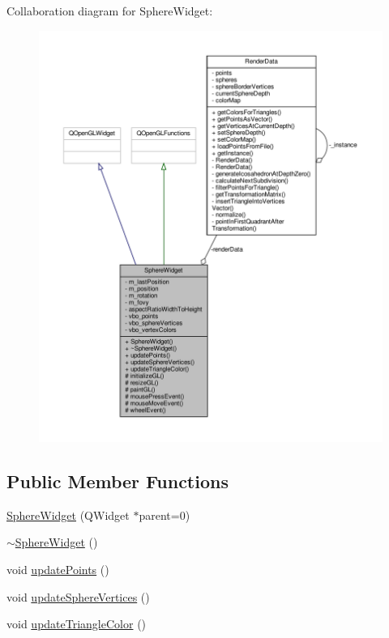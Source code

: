 Collaboration diagram for Sphere\+Widget\+:\nopagebreak
\begin{figure}[H]
\begin{center}
\leavevmode
\includegraphics[width=350pt]{class_sphere_widget__coll__graph}
\end{center}
\end{figure}
\subsection*{Public Member Functions}
\begin{DoxyCompactItemize}
\item 
\hyperlink{class_sphere_widget_a6ee7b3a4b58e5d62fb1c901aafdd1790}{Sphere\+Widget} (Q\+Widget $\ast$parent=0)
\item 
\hyperlink{class_sphere_widget_a1766e5d68f4c57f52d6b1ee40cc0326c}{$\sim$\+Sphere\+Widget} ()
\item 
void \hyperlink{class_sphere_widget_a692ca1c1e7556f6abd7b5f6a49a2557c}{update\+Points} ()
\item 
void \hyperlink{class_sphere_widget_a7d132800fb4d6b7b925c253679bb6445}{update\+Sphere\+Vertices} ()
\item 
void \hyperlink{class_sphere_widget_a871c5252a7a218c5d405be5dfc3dbfa1}{update\+Triangle\+Color} ()
\end{DoxyCompactItemize}
